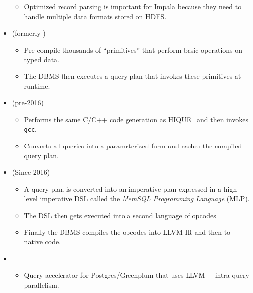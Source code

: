 \documentclass[11pt]{article}
\begin{document}
\begin{itemize}
\begin{itemize}
        \item
        Optimized record parsing is important for Impala because they need to handle multiple 
        data formats stored on HDFS.
    \end{itemize}
    
    \item {} (formerly )~\cite{raducanu13}
    \begin{itemize}
        \item
        Pre-compile thousands of ``primitives'' that perform basic operations on typed data.
        
        \item
        The DBMS then executes a query plan that invokes these primitives at runtime.
    \end{itemize}
    
    \item {} (pre-2016)
    \begin{itemize}
        \item
        Performs the same C/C++ code generation as HIQUE~\cite{krikellas10} and then invokes 
        \texttt{gcc}.
        
        \item
        Converts all queries into a parameterized form and caches the compiled query plan.
    \end{itemize}

    \item {} (Since 2016)~\cite{paroski16}
    \begin{itemize}
        \item
        A query plan is converted into an imperative plan expressed in a high-level imperative 
        DSL called the \textit{MemSQL Programming Language} (MLP).
        
        \item
        The DSL then gets executed into a second language of opcodes
        
        \item
        Finally the DBMS compiles the opcodes into LLVM IR and then to native code.
    \end{itemize}

    \item {}
    \begin{itemize}
        \item
        Query accelerator for Postgres/Greenplum that uses LLVM + intra-query parallelism.
    \end{itemize}
    

\end{itemize}
\end{document}
